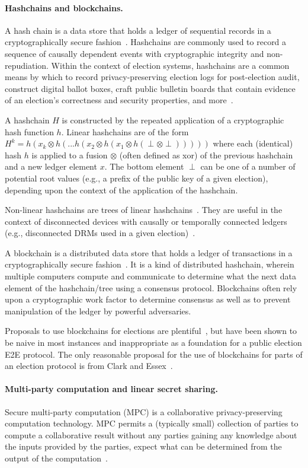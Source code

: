 \paragraph{Hashchains and blockchains.} A hash chain is a data store
that holds a ledger of sequential records in a cryptographically
secure fashion~\cite{HC}. Hashchains are commonly used to record a
sequence of causally dependent events with cryptographic integrity and
non-repudiation. Within the context of election systems, hashchains
are a common means by which to record privacy-preserving election logs
for post-election audit, construct digital ballot boxes, craft public
bulletin boards that contain evidence of an election's correctness and
security properties, and more~\cite{HC-for-elections}.

A hashchain $H$ is constructed by the repeated application of a
cryptographic hash function $h$. Linear hashchains are of the form
$H^{k}=h(x_{k} \otimes h(...h(x_{2} \otimes h(x_{1} \otimes h(\perp
\otimes \perp)))))$
where each (identical) hash $h$ is applied to a fusion $\otimes$
(often defined as xor) of the previous hashchain and a new ledger
element $x$. The bottom element $\perp$ can be one of a number of
potential root values (e.g., a prefix of the public key of a given
election), depending upon the context of the application of the
hashchain. 

Non-linear hashchains are trees of linear hashchains~\cite{NLHC}. They
are useful in the context of disconnected devices with causally or
temporally connected ledgers (e.g., disconnected DRMs used in a given
election)~\cite{NLHC-for-elections}.

A blockchain is a distributed data store that holds a ledger of
transactions in a cryptographically secure
fashion~\cite{blockchains}. It is a kind of distributed hashchain,
wherein multiple computers compute and communicate to determine what
the next data element of the hashchain/tree using a consensus
protocol. Blockchains often rely upon a cryptographic work factor to
determine consensus as well as to prevent manipulation of the ledger
by powerful adversaries.

Proposals to use blockchains for elections are
plentiful~\cite{blockchains-for-elections}, but have been shown to be
naive in most instances and inappropriate as a foundation for a public
election E2E protocol. The only reasonable proposal for the use of
blockchains for parts of an election protocol is from Clark and
Essex~\cite{CommitCoin}.

\paragraph{Multi-party computation and linear secret sharing.} Secure
multi-party computation (MPC) is a collaborative privacy-preserving
computation technology.  MPC permits a (typically small) collection of
parties to compute a collaborative result without any parties gaining
any knowledge about the inputs provided by the parties, expect what
can be determined from the output of the computation~\cite{MPC}. 

